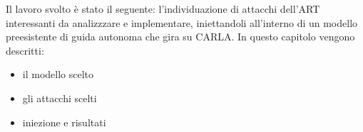 Il lavoro svolto è stato il seguente:  l'individuazione di attacchi dell'ART interessanti da analizzzare e implementare, iniettandoli all'interno di un modello preesistente di guida
autonoma che gira su CARLA. In questo capitolo vengono descritti:\begin{itemize}
    \item il modello scelto
    \item gli attacchi scelti
    \item iniezione e risultati
\end{itemize}






